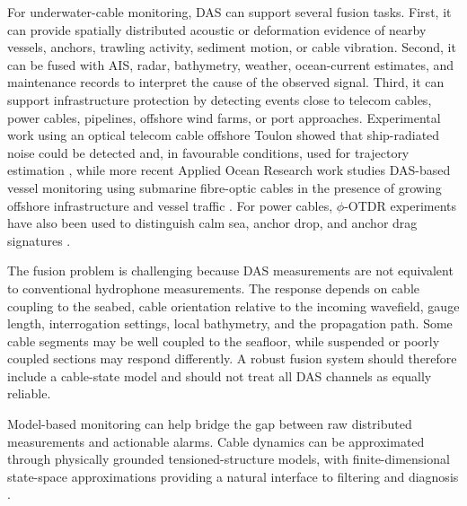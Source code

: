 For underwater-cable monitoring, DAS can support several fusion tasks. First, it can provide spatially distributed acoustic or deformation evidence of nearby vessels, anchors, trawling activity, sediment motion, or cable vibration. Second, it can be fused with AIS, radar, bathymetry, weather, ocean-current estimates, and maintenance records to interpret the cause of the observed signal. Third, it can support infrastructure protection by detecting events close to telecom cables, power cables, pipelines, offshore wind farms, or port approaches. Experimental work using an optical telecom cable offshore Toulon showed that ship-radiated noise could be detected and, in favourable conditions, used for trajectory estimation \cite{rivet_ship_2021}, while more recent Applied Ocean Research work studies DAS-based vessel monitoring using submarine fibre-optic cables in the presence of growing offshore infrastructure and vessel traffic \cite{paap_vessel_2025}. For power cables, \(\phi\)-OTDR experiments have also been used to distinguish calm sea, anchor drop, and anchor drag signatures \cite{lv_otdr_2018}.

The fusion problem is challenging because DAS measurements are not equivalent to conventional hydrophone measurements. The response depends on cable coupling to the seabed, cable orientation relative to the incoming wavefield, gauge length, interrogation settings, local bathymetry, and the propagation path. Some cable segments may be well coupled to the seafloor, while suspended or poorly coupled sections may respond differently. A robust fusion system should therefore include a cable-state model and should not treat all DAS channels as equally reliable.

Model-based monitoring can help bridge the gap between raw distributed measurements and actionable alarms. Cable dynamics can be approximated through physically grounded tensioned-structure models, with finite-dimensional state-space approximations providing a natural interface to filtering and diagnosis \cite{irvine_linear_1974,baudouin_cable_pde_2018}. 
